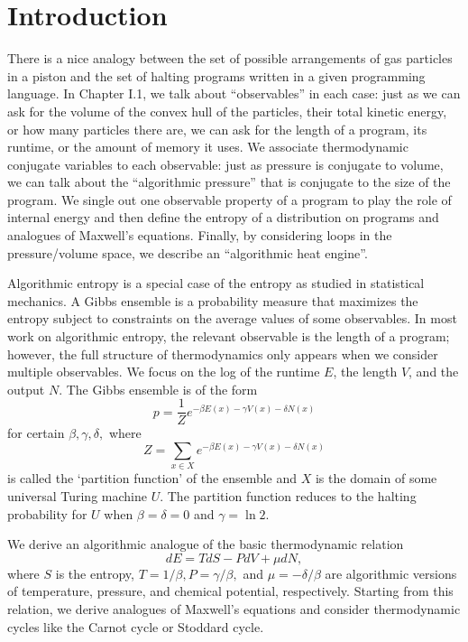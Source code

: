 \documentclass[12pt,twoside,openright]{report}
\begin{document}
  \tableofcontents
  \vfill
  \pagebreak

\renewcommand{\thepage}{\arabic{page}}
\setcounter{page}{1}
\chapter*{Introduction}

There is a nice analogy between the set of possible arrangements of gas particles in a piston and the set of halting programs written in a given programming language.  In Chapter I.1, we talk about ``observables'' in each case: just as we can ask for the volume of the convex hull of the particles, their total kinetic energy, or how many particles there are, we can ask for the length of a program, its runtime, or the amount of memory it uses.  We associate thermodynamic conjugate variables to each observable: just as pressure is conjugate to volume, we can talk about the ``algorithmic pressure'' that is conjugate to the size of the program.  We single out one observable property of a program to play the role of internal energy and then define the entropy of a distribution on programs and analogues of Maxwell's equations.  Finally, by considering loops in the pressure/volume space, we describe an ``algorithmic heat engine''.

Algorithmic entropy is a special case of the entropy as studied in statistical mechanics.  A Gibbs ensemble is a probability measure that maximizes the entropy subject to constraints on the average values of some observables.  In most work on algorithmic entropy, the relevant observable is the length of a program; however, the full structure of thermodynamics only appears when we consider multiple observables.  We focus on the log of the runtime $E$, the length $V$, and the output $N$.  The Gibbs ensemble is of the form
\[ p = \frac{1}{Z} e^{-\beta E(x) - \gamma V(x) - \delta N(x)} \]
for certain $\beta, \gamma, \delta,$ where
\[ Z = \sum_{x \in X} e^{-\beta E(x) - \gamma V(x) - \delta N(x)} \]
is called the `partition function' of the ensemble and $X$ is the domain of some universal Turing machine $U$.  The partition function reduces to the halting probability for $U$ when $\beta = \delta = 0$ and $\gamma = \ln 2$.

We derive an algorithmic analogue of the basic thermodynamic relation
\[ dE = TdS - PdV + μdN, \]
where $S$ is the entropy, $T = 1/\beta, P = \gamma/\beta,$ and $\mu = -\delta/\beta$ are algorithmic versions of temperature, pressure, and chemical potential, respectively.  Starting from this relation, we derive analogues of Maxwell's equations and consider thermodynamic cycles like the Carnot cycle or Stoddard cycle.
\end{document}
